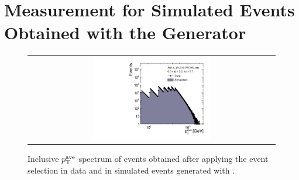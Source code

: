 \section{Measurement for Simulated Events Obtained with the \herwig Generator} 
\label{sec:jer_result_herwig}
\begin{figure}[!ph]
  \centering
  \begin{tabular}{c}
                \includegraphics[width=0.49\textwidth]{figures/HerwigPtAve__AfterAsymmHistos.pdf}
  \end{tabular}
  \caption{Inclusive $p_{\text{T}}^\mathrm{ave}$ spectrum of events obtained after applying the event selection in data and in simulated events generated with \herwig.}
  \label{fig:control_plots_herwig}
\end{figure}
